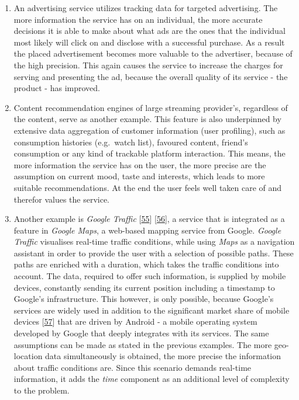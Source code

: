\documentclass[12pt,english,a4paper,titlepage,cleardoublepage=empty,dottedtoc]{report}
\begin{document}
\begin{enumerate}
\def\labelenumi{(\Alph{enumi})}
\item
  An advertising service utilizes tracking data for targeted
  advertising. The more information the service has on an individual,
  the more accurate decisions it is able to make about what ads are the
  ones that the individual most likely will click on and disclose with a
  successful purchase. As a result the placed advertisement becomes more
  valuable to the advertiser, because of the high precision. This again
  causes the service to increase the charges for serving and presenting
  the ad, because the overall quality of its service - the product - has
  improved.
\item
  Content recommendation engines of large streaming provider's,
  regardless of the content, serve as another example. This feature is
  also underpinned by extensive data aggregation of customer information
  (user profiling), such as consumption histories (e.g.~watch list),
  favoured content, friend's consumption or any kind of trackable
  platform interaction. This means, the more information the service has
  on the user, the more precise are the assumption on current mood,
  taste and interests, which leads to more suitable recommendations. At
  the end the user feels well taken care of and therefor values the
  service.
\item
  Another example is \emph{Google Traffic}
  {[}\protect\hyperlink{ref-web_2007_introducing-google-traffic}{55}{]}
  {[}\protect\hyperlink{ref-web_2016_wikipedia_google-traffic}{56}{]}, a
  service that is integrated as a feature in \emph{Google Maps}, a
  web-based mapping service from Google. \emph{Google Traffic}
  visualises real-time traffic conditions, while using \emph{Maps} as a
  navigation assistant in order to provide the user with a selection of
  possible paths. These paths are enriched with a duration, which takes
  the traffic conditions into account. The data, required to offer such
  information, is supplied by mobile devices, constantly sending its
  current position including a timestamp to Google's infrastructure.
  This however, is only possible, because Google's services are widely
  used in addition to the significant market share of mobile devices
  {[}\protect\hyperlink{ref-graphic_2016_global-mobile-os-market-share}{57}{]}
  that are driven by Android - a mobile operating system developed by
  Google that deeply integrates with its services. The same assumptions
  can be made as stated in the previous examples. The more geo-location
  data simultaneously is obtained, the more precise the information
  about traffic conditions are. Since this scenario demands real-time
  information, it adds the \emph{time} component as an additional level
  of complexity to the problem.
\end{enumerate}
\end{document}
